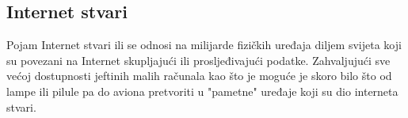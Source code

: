 \clearpage
\subsection{Internet stvari} \label{sec:IOT}
Pojam Internet stvari ili  se odnosi na milijarde fizičkih uređaja diljem svijeta koji su povezani na Internet
skupljajući ili prosljeđivajući podatke. \cite{IOT}
\paraBreak
Zahvaljujući sve većoj dostupnosti jeftinih malih računala kao što je  moguće je skoro bilo što
od lampe ili pilule pa do aviona pretvoriti u "pametne" uređaje koji su dio interneta stvari.